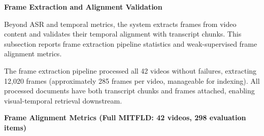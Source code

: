 \textbf{Frame Extraction and Alignment Validation}

Beyond ASR and temporal metrics, the system extracts frames from video content and validates their temporal alignment with transcript chunks. This subsection reports frame extraction pipeline statistics and weak-supervised frame alignment metrics.

\begin{table}[H]
    \centering
    \caption{Frame Extraction and Processing Pipeline.}
    \label{tab:frame_extraction_stats}
\end{table}

The frame extraction pipeline processed all 42 videos without failures, extracting 12,020 frames (approximately 285 frames per video, manageable for indexing). All processed documents have both transcript chunks and frames attached, enabling visual-temporal retrieval downstream.

\textbf{Frame Alignment Metrics (Full MITFLD: 42 videos, 298 evaluation items)}

\begin{table}[H]
    \centering
    \caption{Frame Alignment Quality Across Retrieval Depths.}
    \label{tab:frame_alignment}
\end{table}

